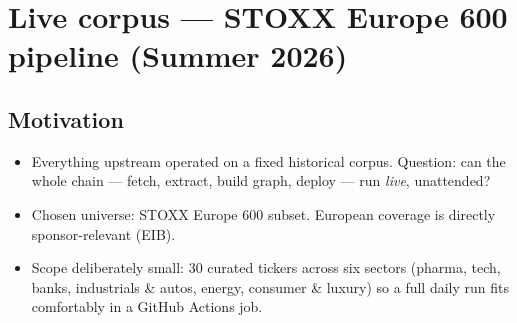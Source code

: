 \documentclass[11pt]{article}
\begin{document}
\section{Live corpus --- STOXX Europe 600 pipeline (Summer 2026)}
\label{sec:stoxx}

\subsection{Motivation}
\begin{itemize}
  \item Everything upstream operated on a fixed historical corpus. Question: can the whole chain --- fetch, extract, build graph, deploy --- run \emph{live}, unattended?
  \item Chosen universe: STOXX Europe 600 subset. European coverage is directly sponsor-relevant (EIB).
  \item Scope deliberately small: 30 curated tickers across six sectors (pharma, tech, banks, industrials \& autos, energy, consumer \& luxury) so a full daily run fits comfortably in a GitHub Actions job.
\end{itemize}
\end{document}
